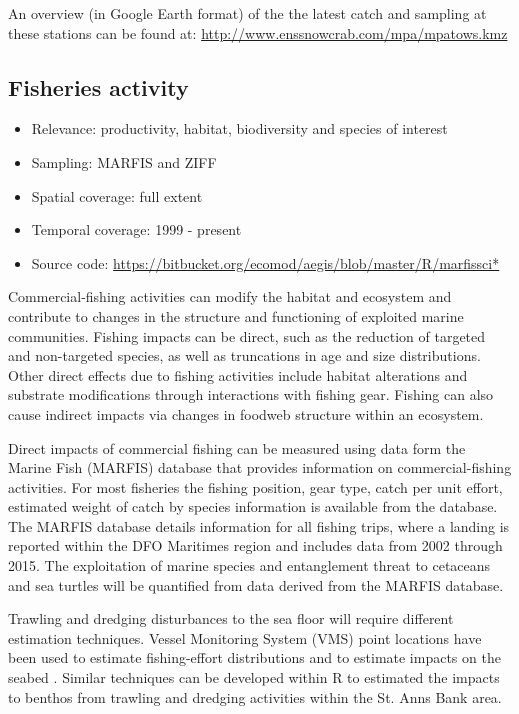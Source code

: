 \documentclass[letterpaper,portrait,11pt]{scrartcl}
\numberwithin{equation}{section}    %
\numberwithin{figure}{section}    %
\numberwithin{table}{section}       %
\begin{document}
An overview (in Google Earth format) of the the latest catch and sampling at these stations can be found at: \url{http://www.enssnowcrab.com/mpa/mpatows.kmz}


\subsection{Fisheries activity}

\begin{itemize}
	\item Relevance:  productivity, habitat, biodiversity and species of interest
	\item Sampling:  MARFIS and ZIFF
	\item Spatial coverage: full extent 
	\item Temporal coverage: 1999 - present
	\item Source code: \url{https://bitbucket.org/ecomod/aegis/blob/master/R/marfissci*}
\end{itemize}	


Commercial-fishing activities can modify the habitat and ecosystem and contribute to changes in the structure and functioning of exploited marine communities.  Fishing impacts can be direct, such as the reduction of targeted and non-targeted species, as well as truncations in age and size distributions.  Other direct effects due to fishing activities include habitat alterations and substrate modifications through interactions with fishing gear. Fishing can also cause indirect impacts via changes in foodweb structure within an ecosystem.  

Direct impacts of commercial fishing can be measured using data form the Marine Fish (MARFIS) database that provides information on commercial-fishing activities.  For most fisheries the fishing position, gear type, catch per unit effort, estimated weight of catch by species information is available from the database. The MARFIS database details information for all fishing trips, where a landing is reported within the DFO Maritimes region and includes data from 2002 through 2015. The exploitation of marine species and entanglement threat to cetaceans and sea turtles will be quantified from data derived from the MARFIS database.

Trawling and dredging disturbances to the sea floor will require different estimation techniques.  Vessel Monitoring System (VMS) point locations have been used to estimate fishing-effort distributions \parencites[e.g., ][]{lee2010developing} and to estimate impacts on the seabed \parencite{gerritsen2013much}.  Similar techniques can be developed within R to estimated the impacts to benthos from trawling and dredging activities within the St. Anns Bank area. 
\end{document}
